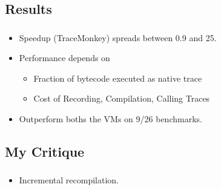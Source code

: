 \documentclass[mathserif,10pt]{beamer}
\newcommand{\cmt}[1]{}
\begin{document}
\subsection{Results}
\frame
{
  \frametitle{\subsecname}
  \begin{itemize}
    \item Speedup (TraceMonkey) spreads between 0.9 and 25. 
    \item Performance depends on
    \begin{itemize}
      \item Fraction of bytecode executed as native trace
      \item Cost of Recording, Compilation, Calling Traces
      \cmt{good perf when where VM spends mojority of time running native code}
    \end{itemize}
    \item Outperform boths the VMs on 9/26 benchmarks.
  \end{itemize}
}
\cmt{
TRacing achieves speedup upto a amx to 25 for 2 benchmark programs. Those are short programs 
  with lot of integer bitwise operations. So TM can cover the entire exec in 1 2 traces
  that operate on intergers

  The programs where they get lowest speedups are those which the current implementation does not trace like recusrison
  and they do generate any natice code

  type specialization to use integer arithmatic improves a lot of performance
  performance suffers where we cannot trace and instead fall back into the I
}

\subsection{My Critique}
\frame
{
  \frametitle{\subsecname}
  \begin{itemize}
  \cmt{
    \item Web as Desktop
      In short, plenty. JavaScript has become a predominant technology amongst today's web developers, and Mozilla—along with pretty much every web browser maker out there—aims to make it just as fast as code that runs on your desktop. The closer everyone gets to that kind of speed, the closer the idea of the Web as Desktop gets to reality. This is handily demonstrated in a video demonstration of online photo editing over at Mozilla's site. With just-in-time compiling, actions the user takes on a web program move along as if being adjusted in a desktop app, as opposed to having to basically re-load an entire JavaScript app and figure out what state it's in.}
    \item Incremental recompilation.
  \end{itemize}
}
\end{document}
